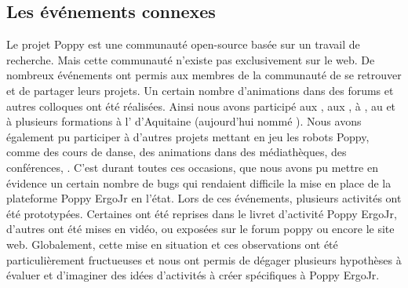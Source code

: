     \subsection{Les événements connexes}\label{sec:on-stage}\label{sec:canope_danse}
        Le projet Poppy est une communauté open-source basée sur un travail de recherche. Mais cette communauté n'existe pas exclusivement sur le web. De nombreux événements ont permis aux membres de la communauté de se retrouver et de partager leurs projets.
            Un certain nombre d'animations dans des forums et autres colloques ont été réalisées. Ainsi nous avons participé aux , aux , à , au  et à plusieurs formations à l' d'Aquitaine (aujourd'hui nommé ). Nous avons également pu participer à d'autres projets mettant en jeu les robots Poppy, comme des cours de danse, des animations dans des médiathèques, des conférences, \etc. C'est durant toutes ces occasions, que nous avons pu mettre en évidence un certain nombre de bugs qui rendaient difficile la mise en place de la plateforme Poppy ErgoJr en l'état. Lors de ces événements, plusieurs activités ont été prototypées. Certaines ont été reprises dans le livret d'activité Poppy ErgoJr, d'autres ont été mises en vidéo, ou exposées sur le forum poppy ou encore le site web. Globalement, cette mise en situation et ces observations ont été particulièrement fructueuses et nous ont permis de dégager plusieurs hypothèses à évaluer et d'imaginer des idées d'activités à créer spécifiques à Poppy ErgoJr.
